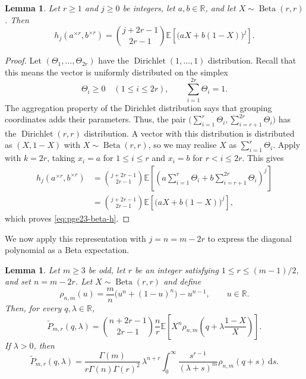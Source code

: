 \documentclass[11pt]{article}
\newtheorem{lemma}[theorem]{Lemma}
\theoremstyle{remark}
\numberwithin{equation}{section}
\newcommand{\R}{\mathbb R}
\newcommand{\dd}{\,\mathrm d}
\newcommand{\E}{\mathbb E}
\newcommand{\BetaLaw}{\operatorname{Beta}}
\begin{document}
\begin{lemma}\label{lem:pge23-beta-representation}
  Let $r\ge1$ and $j\ge0$ be integers, let $a,b\in\R$, and let
  $X\sim\BetaLaw(r,r)$. Then
  \begin{equation}\label{eq:pge23-beta-h}
    h_j(a^{\times r},b^{\times r})
    =\binom{j+2r-1}{2r-1}
    \E\left[\bigl(aX+b(1-X)\bigr)^j\right].
  \end{equation}
\end{lemma}

\begin{proof}
  Let $(\Theta_1,\ldots,\Theta_{2r})$ have the
  $\operatorname{Dirichlet}(1,\ldots,1)$ distribution.
  Recall that this means the vector is uniformly distributed on the simplex
  \[
    \Theta_i\ge0\quad(1\le i\le2r),\qquad
    \sum_{i=1}^{2r}\Theta_i=1.
  \]
  The aggregation property of the Dirichlet distribution says that grouping
  coordinates adds their parameters. Thus, the pair
  $\bigl(\sum_{i=1}^r\Theta_i,\sum_{i=r+1}^{2r}\Theta_i\bigr)$ has the
  $\operatorname{Dirichlet}(r,r)$ distribution.
  A vector with this distribution is distributed as $(X,1-X)$ with
  $X\sim\BetaLaw(r,r)$, so we may realise $X$ as $\sum_{i=1}^r\Theta_i$.
  Apply  with $k=2r$, taking $x_i=a$
  for $1\le i\le r$ and $x_i=b$ for $r<i\le2r$. This gives
  \begin{align*}
    h_j(a^{\times r},b^{\times r})
    &=\binom{j+2r-1}{2r-1}
      \E\left[\left(a\sum_{i=1}^r\Theta_i+
        b\sum_{i=r+1}^{2r}\Theta_i\right)^j\right]\\
    &=\binom{j+2r-1}{2r-1}\E\left[\bigl(aX+b(1-X)\bigr)^j\right],
  \end{align*}
  which proves \eqref{eq:pge23-beta-h}.
\end{proof}

We now apply this representation with $j=n=m-2r$ to express the diagonal
polynomial as a Beta expectation.

\begin{lemma}\label{lem:pge23-beta}
  Let $m\ge3$ be odd, let $r$ be an integer satisfying
  $1\le r\le(m-1)/2$, and set $n=m-2r$.
  Let $X\sim\BetaLaw(r,r)$ and define
  \begin{equation}\label{eq:pge23-rho}
    \rho_{n,m}(u)
    =\frac {m}{n}\bigl(u^n+(1-u)^n\bigr)-u^{n-1},
    \qquad u\in\R.
  \end{equation}
  Then, for every $q,\lambda\in\R$,
  \begin{equation}\label{eq:pge23-beta-second}
    \widetilde P_{m,r}(q,\lambda)
    =\binom{n+2r-1}{2r-1}\frac {n}{r}
    \E\left[
    X^n\rho_{n,m}\left(q+\lambda\frac{1-X}{X}\right)
    \right].
  \end{equation}
  If $\lambda>0$, then
  \begin{equation}\label{eq:pge23-beta-integral}
    \widetilde P_{m,r}(q,\lambda)
    =\frac{\Gamma(m)}{r\Gamma(n)\Gamma(r)^2}\,
    \lambda^{n+r}
    \int_0^\infty
    \frac{s^{r-1}}{(\lambda+s)^m}\rho_{n,m}(q+s)\dd s.
  \end{equation}
\end{lemma}
\end{document}
